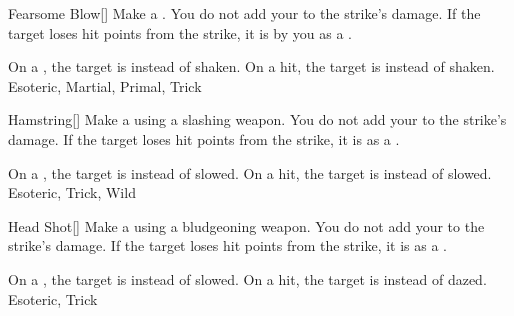 \lowercase{\hypertarget{maneuver:Fearsome Blow}{}}\label{maneuver:Fearsome Blow}
\hypertarget{maneuver:Fearsome Blow}{}
\begin{freeability}[Rank 3]{Fearsome Blow}[]
Make a .
You do not add your  to the strike's damage.
If the target loses hit points from the strike, it is  by you as a .

\rankline
{} On a , the target is  instead of shaken.
 On a hit, the target is  instead of shaken.
 Esoteric, Martial, Primal, Trick
\end{freeability}
\vspace{0.25em}



\lowercase{\hypertarget{maneuver:Hamstring}{}}\label{maneuver:Hamstring}
\hypertarget{maneuver:Hamstring}{}
\begin{freeability}[Rank 3]{Hamstring}[]
Make a  using a slashing weapon.
You do not add your  to the strike's damage.
If the target loses hit points from the strike, it is  as a .

\rankline
{} On a , the target is  instead of slowed.
 On a hit, the target is  instead of slowed.
 Esoteric, Trick, Wild
\end{freeability}
\vspace{0.25em}



\lowercase{\hypertarget{maneuver:Head Shot}{}}\label{maneuver:Head Shot}
\hypertarget{maneuver:Head Shot}{}
\begin{freeability}[Rank 3]{Head Shot}[]
Make a  using a bludgeoning weapon.
You do not add your  to the strike's damage.
If the target loses hit points from the strike, it is  as a .

\rankline
{} On a , the target is  instead of slowed.
 On a hit, the target is  instead of dazed.
 Esoteric, Trick
\end{freeability}
\vspace{0.25em}



